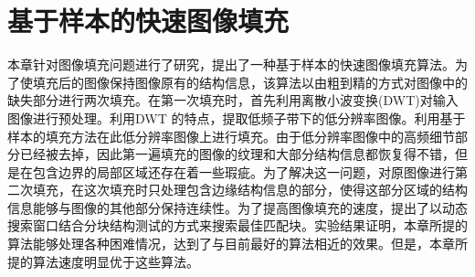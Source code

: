 ﻿\chapter{基于样本的快速图像填充}
 \label{ch3:Inpainting}
 本章针对图像填充问题进行了研究，提出了一种基于样本的快速图像填充算法。为了使填充后的图像保持图像原有的结构信息，该算法以由粗到精的方式对图像中的缺失部分进行两次填充。在第一次填充时，首先利用离散小波变换(DWT)对输入图像进行预处理。利用DWT 的特点，提取低频子带下的低分辨率图像。利用基于样本的填充方法在此低分辨率图像上进行填充。由于低分辨率图像中的高频细节部分已经被去掉，因此第一遍填充的图像的纹理和大部分结构信息都恢复得不错，但是在包含边界的局部区域还存在着一些瑕疵。为了解决这一问题，对原图像进行第二次填充，在这次填充时只处理包含边缘结构信息的部分，使得这部分区域的结构信息能够与图像的其他部分保持连续性。为了提高图像填充的速度，提出了以动态搜索窗口结合分块结构测试的方式来搜索最佳匹配块。实验结果证明，本章所提的算法能够处理各种困难情况，达到了与目前最好的算法相近的效果。但是，本章所提的算法速度明显优于这些算法。
